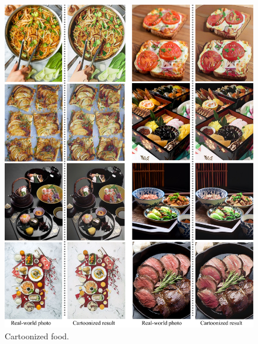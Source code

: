 \documentclass[10pt,twocolumn,letterpaper]{article}
\begin{document}
\begin{figure}[b]
\vspace{-0.5em}
\centering
\includegraphics[width=\linewidth]{figures/food.pdf}
\caption{Cartoonized food.}
\label{fig:food}
\end{figure}
\end{document}
